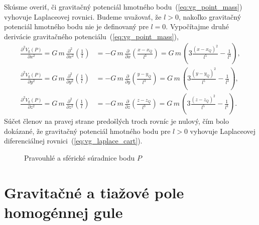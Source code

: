 \documentclass[a4paper, 12pt]{book}
\newcommand{\gidx}{\mathrm g}
\begin{document}
Skúsme overiť, či gravitačný potenciál hmotného bodu~(\ref{eq:vg_point_mass}) 
vyhovuje Laplaceovej rovnici.  Budeme uvažovať, že $l > 0$, nakoľko gravitačný 
potenciál hmotného bodu nie je definovaný pre $l = 0$.  Vypočítajme druhé 
derivácie gravitačného potenciálu~(\ref{eq:vg_point_mass}),
%
\begin{equation}
\begin{split}
\frac{\partial^2 V_\gidx(P)}{\partial x^2} = G\, m \, 
\frac{\partial^2}{\partial x^2} \left( \frac{1}{l} \right) &= -G\, m \, 
\frac{\partial}{\partial x} \left( \frac{x - x_Q}{l^3} \right) = G \, m \, 
\left(3 \frac{(x - x_Q)^2}{l^5} - \frac{1}{l^3} \right){,}\\
%
\frac{\partial^2 V_\gidx(P)}{\partial y^2} = G\, m \, 
\frac{\partial^2}{\partial y^2} \left( \frac{1}{l} \right) &= -G\, m \, 
\frac{\partial}{\partial y} \left( \frac{y - y_Q}{l^3} \right) = G \, m \, 
\left(3 \frac{(y - y_Q)^2}{l^5} - \frac{1}{l^3} \right){,}\\
%
\frac{\partial^2 V_\gidx(P)}{\partial z^2} = G\, m \, 
\frac{\partial^2}{\partial z^2} \left( \frac{1}{l} \right) &= -G\, m \, 
\frac{\partial}{\partial z} \left( \frac{z - z_Q}{l^3} \right) = G \, m \, 
\left(3 \frac{(z - z_Q)^2}{l^5} - \frac{1}{l^3} \right){.}
\end{split}
\end{equation}
%
Súčet členov na pravej strane predošlých troch rovníc je nulový, čím bolo 
dokázané, že gravitačný potenciál hmotného bodu pre $l > 0$ vyhovuje 
Laplaceovej diferenciálnej rovnici~(\ref{eq:vg_laplace_cart}).



\begin{figure}[b]
\centering

\caption{Pravouhlé a sférické súradnice bodu $P$}
\label{fig:cart_sph}
\end{figure}








\chapter{Gravitačné a tiažové pole homogénnej gule}
\end{document}
